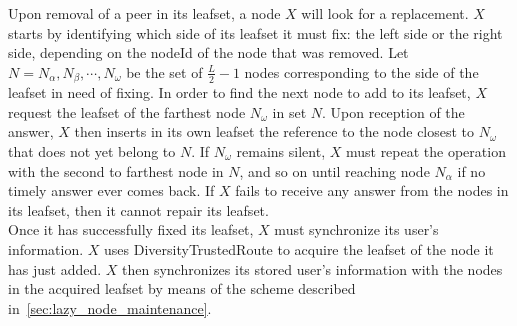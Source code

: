 Upon removal of a peer in its leafset, a node $X$ will look for a replacement.
$X$ starts by identifying which side of its leafset it must fix: the left side
or the right side, depending on the nodeId of the node that was removed. Let $N
= {N_{\alpha}, N_{\beta}, \cdots, N_{\omega}}$ be the set of $\frac{L}{2} - 1$
nodes corresponding to the side of the leafset in need of fixing. In order to
find the next node to add to its leafset, $X$ request the leafset of the
farthest node $N_{\omega}$ in set $N$. Upon reception of the answer, $X$ then
inserts in its own leafset the reference to the node closest to $N_{\omega}$
that does not yet belong to $N$. If $N_{\omega}$ remains silent, $X$ must
repeat the operation with the second to farthest node in $N$, and so on until
reaching node $N_{\alpha}$ if no timely answer ever comes back. If $X$ fails to
receive any answer from the nodes in its leafset, then it cannot repair its
leafset.\\

Once it has successfully fixed its leafset, $X$ must synchronize its user's
information. $X$
uses DiversityTrustedRoute to acquire the leafset of the node it has just
added. $X$ then synchronizes its stored user's information with the nodes in
the acquired leafset by means of the scheme described in~\ref{sec:lazy_node_maintenance}.

